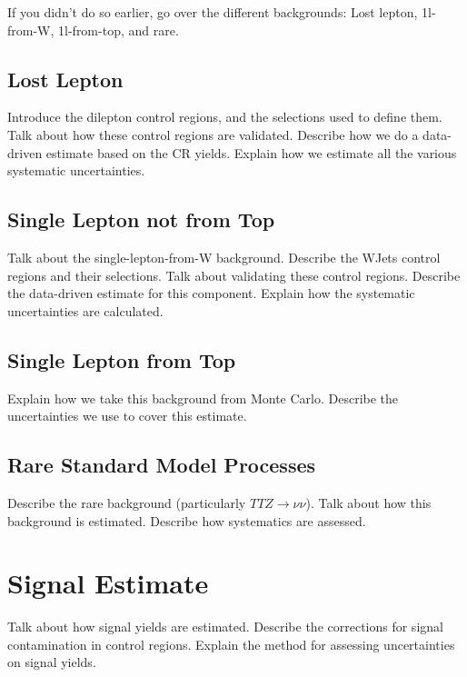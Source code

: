 If you didn't do so earlier, go over the different backgrounds:
Lost lepton, 1l-from-W, 1l-from-top, and rare.

\subsection{Lost Lepton}
\label{ssec:stop:lostlep}

Introduce the dilepton control regions, and the selections used
to define them.
Talk about how these control regions are validated.
Describe how we do a data-driven estimate based on the CR yields.
Explain how we estimate all the various systematic uncertainties.

\subsection{Single Lepton not from Top}
\label{ssec:stop:1lw}

Talk about the single-lepton-from-W background.
Describe the WJets control regions and their selections.
Talk about validating these control regions.
Describe the data-driven estimate for this component.
Explain how the systematic uncertainties are calculated.

\subsection{Single Lepton from Top}
\label{ssec:stop:1ltop}

Explain how we take this background from Monte Carlo.
Describe the uncertainties we use to cover this estimate.

\subsection{Rare Standard Model Processes}
\label{ssec:stop:1lrare}

Describe the rare background (particularly $TTZ \rightarrow \nu\nu$).
Talk about how this background is estimated.
Describe how systematics are assessed.

\section{Signal Estimate}
\label{sec:stop:signal}

Talk about how signal yields are estimated.
Describe the corrections for signal contamination in control regions.
Explain the method for assessing uncertainties on signal yields.

